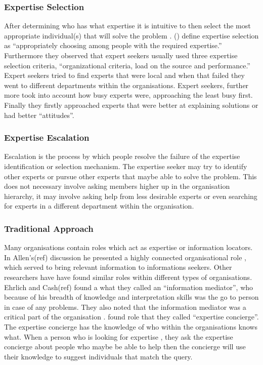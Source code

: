 \documentclass[a4paper,oneside,11pt]{report}
\begin{document}
\subsubsection{Expertise Selection} 
After determining who has what expertise it is intuitive to then select the most appropriate individual(s) that will solve the problem \citeauthor{mcdonalackerman1998}. (\citeyear{mcdonalackerman1998}) define expertise selection as \enquote {appropriately choosing among people with the required expertise.} Furthermore they observed that expert seekers usually used three expertise selection criteria, \enquote {organizational criteria, load on the source and performance.} Expert seekers tried to find experts that were local and when that failed they went to different departments within the organisations. Expert seekers, further more took into account how busy experts were, approaching the least busy first. Finally they firstly approached experts that were better at explaining solutions or had better \enquote {attitudes}.
\subsubsection{Expertise Escalation} 
Escalation is the process by which people resolve the failure of the expertise identification or selection mechanism. The expertise seeker may try to identify other experts or pursue other experts that maybe able to solve the problem.  This does not necessary involve asking members higher up in the organisation hierarchy, it may involve asking help from less desirable experts or even searching for experts in a different department within the organisation\autocite{mcdonalackerman1998}.

\subsubsection{Traditional Approach}
Many organisations contain roles which act as expertise or information locators.
In Allen's(ref) discussion he presented a highly connected organisational role , which served to bring relevant information to informations seekers. Other researchers have have found similar roles within different types of organisations. Ehrlich and Cash(ref) found a what they called an \enquote{information mediator}, who because of his breadth of knowledge and interpretation skills was the go to person in case of any problems. They also noted that the information mediator was a critical part of the organisation \autocite{mcdonalackerman1998}. found role that they called \enquote{expertise concierge}. The expertise concierge has the knowledge of who within the organisations knows what. When a person who is looking for expertise , they ask the expertise concierge about people who maybe be able to help then the concierge will use their knowledge to suggest individuals that match the query.
\end{document}
